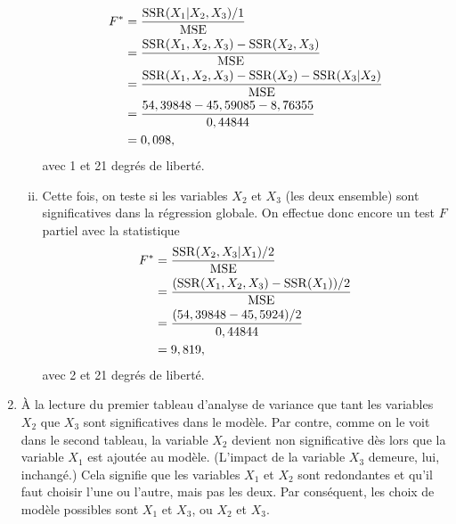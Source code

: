 \begin{solution}{3.11}
\begin{enumerate}
\begin{enumerate}[i)]
\begin{align*}
          F^*
          &= \frac{\mathrm{SSR}(X_1|X_2,X_3)/1}{\mathrm{MSE}} \\
          &= \frac{\mathrm{SSR}(X_1, X_2, X_3) - \mathrm{SSR}(X_2, X_3)}{\mathrm{MSE}} \\
          &= \frac{\mathrm{SSR}(X_1, X_2, X_3) - \mathrm{SSR}(X_2) - \mathrm{SSR}(X_3|X_2)}{\mathrm{MSE}} \\
          &= \frac{54,39848 - 45,59085 - 8,76355}{0,44844} \\
          &= 0,098,
        \end{align*}
        avec 1 et 21 degrés de liberté.
      \item Cette fois, on teste si les variables $X_2$ et $X_3$ (les
        deux ensemble) sont significatives dans la régression globale.
        On effectue donc encore un test $F$ partiel avec la
        statistique
        \begin{align*}
          F^*
          &= \frac{\mathrm{SSR}(X_2, X_3|X_1)/2}{\mathrm{MSE}} \\
          &= \frac{(\mathrm{SSR}(X_1, X_2, X_3) - \mathrm{SSR}(X_1))/2}{\mathrm{MSE}} \\
          &= \frac{(54,39848 - 45,5924)/2}{0,44844} \\
          &= 9,819,
        \end{align*}
        avec 2 et 21 degrés de liberté.
      \end{enumerate}
    \item À la lecture du premier tableau d'analyse de variance que
      tant les variables $X_2$ que $X_3$ sont significatives dans le
      modèle. Par contre, comme on le voit dans le second tableau, la
      variable $X_2$ devient non significative dès lors que la
      variable $X_1$ est ajoutée au modèle. (L'impact de la variable
      $X_3$ demeure, lui, inchangé.) Cela signifie que les variables
      $X_1$ et $X_2$ sont redondantes et qu'il faut choisir l'une ou
      l'autre, mais pas les deux. Par conséquent, les choix de modèle
      possibles sont $X_1$ et $X_3$, ou $X_2$ et $X_3$.
    \end{enumerate}
  
\end{solution}
